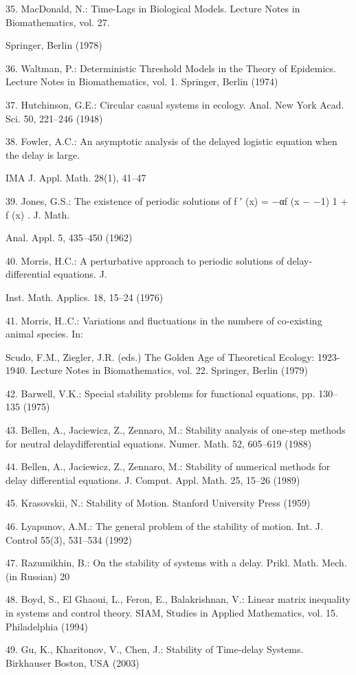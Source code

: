 \documentclass[12pt]{article}
\begin{document}
35. MacDonald, N.: Time-Lags in Biological Models. Lecture Notes in Biomathematics, vol. 27.

Springer, Berlin (1978)

36. Waltman, P.: Deterministic Threshold Models in the Theory of Epidemics. Lecture Notes in Biomathematics, vol. 1. Springer, Berlin (1974)

37. Hutchinson, G.E.: Circular casual systems in ecology. Anal. New York Acad. Sci. 50, 221–246 (1948)

38. Fowler, A.C.: An asymptotic analysis of the delayed logistic equation when the delay is large.

IMA J. Appl. Math. 28(1), 41–47

39. Jones, G.S.: The existence of periodic solutions of f ′ (x) = −αf (x − −1) { 1 + f (x) } . J. Math.

Anal. Appl. 5, 435–450 (1962)

40. Morris, H.C.: A perturbative approach to periodic solutions of delay-differential equations. J.

Inst. Math. Applics. 18, 15–24 (1976)

41. Morris, H..C.: Variations and ﬂuctuations in the numbers of co-existing animal species. In:

Scudo, F.M., Ziegler, J.R. (eds.) The Golden Age of Theoretical Ecology: 1923-1940. Lecture Notes in Biomathematics, vol. 22. Springer, 
Berlin (1979)

42. Barwell, V.K.: Special stability problems for functional equations, pp. 130–135 (1975)

43. Bellen, A., Jaciewicz, Z., Zennaro, M.: Stability analysis of one-step methods for neutral delaydifferential equations. Numer. Math. 52, 
605–619 (1988)

44. Bellen, A., Jaciewicz, Z., Zennaro, M.: Stability of numerical methods for delay differential equations. J. Comput. Appl. Math. 25, 15–26 
(1989)

45. Krasovskii, N.: Stability of Motion. Stanford University Press (1959)

46. Lyapunov, A.M.: The general problem of the stability of motion. Int. J. Control 55(3), 531–534 (1992)

47. Razumikhin, B.: On the stability of systems with a delay. Prikl. Math. Mech. (in Russian) 20

48. Boyd, S., El Ghaoui, L., Feron, E., Balakrishnan, V.: Linear matrix inequality in systems and control theory. SIAM, Studies in Applied 
Mathematics, vol. 15. Philadelphia (1994)

49. Gu, K., Kharitonov, V., Chen, J.: Stability of Time-delay Systems. Birkhauser Boston, USA (2003)
\end{document}

